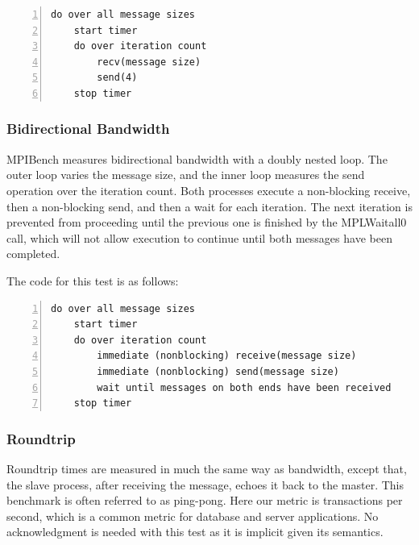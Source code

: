 \begin{minipage}{\textwidth}
\begin{lstlisting}[frame=single,numbers=left]
do over all message sizes 
    start timer
    do over iteration count 
        recv(message size) 
        send(4)
    stop timer
\end{lstlisting}
 \end{minipage}

\subsubsection{Bidirectional Bandwidth}

MPIBench measures bidirectional bandwidth with a doubly nested loop. The outer
loop varies the message size, and the inner loop measures the send operation
over the iteration count. Both processes execute a non-blocking receive, then a
non-blocking send, and then a wait for each iteration. The next iteration is
prevented from proceeding until the previous one is finished by the MPLWaitall0
call, which will not allow execution to continue until both messages have been
completed.

The code for this test is as follows:
 
\begin{minipage}{\textwidth}
\end{minipage}

\begin{minipage}{\textwidth}
\begin{lstlisting}[frame=single,numbers=left]
 do over all message sizes
    start timer
    do over iteration count
        immediate (nonblocking) receive(message size)
        immediate (nonblocking) send(message size)
        wait until messages on both ends have been received
    stop timer
\end{lstlisting}
\end{minipage}

\subsubsection{Roundtrip}

Roundtrip times are measured in much the same way as bandwidth, except that,
the slave process, after receiving the message, echoes it back to the master.
This benchmark is often referred to as ping-pong. Here our metric is
transactions per second, which is a common metric for database and server
applications. No acknowledgment is needed with this test as it is implicit
given its semantics.

